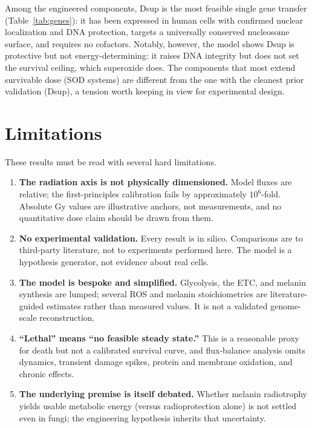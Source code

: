 \documentclass[11pt]{article}
\begin{document}
Among the engineered components, Dsup is the most feasible single gene transfer
(Table~\ref{tab:genes}): it has been expressed in human cells with confirmed
nuclear localization and DNA protection, targets a universally conserved nucleosome
surface, and requires no cofactors. Notably, however, the model shows Dsup is
protective but not energy-determining: it raises DNA integrity but does not set the
survival ceiling, which superoxide does. The components that most extend survivable
dose (SOD systems) are different from the one with the cleanest prior validation
(Dsup), a tension worth keeping in view for experimental design.

\section{Limitations}
\label{sec:limitations}

These results must be read with several hard limitations.
\begin{enumerate}
  \item \textbf{The radiation axis is not physically dimensioned.} Model fluxes are
  relative; the first-principles calibration fails by approximately $10^{6}$-fold.
  Absolute Gy values are illustrative anchors, not measurements, and no quantitative
  dose claim should be drawn from them.
  \item \textbf{No experimental validation.} Every result is in silico. Comparisons
  are to third-party literature, not to experiments performed here. The model is a
  hypothesis generator, not evidence about real cells.
  \item \textbf{The model is bespoke and simplified.} Glycolysis, the ETC, and
  melanin synthesis are lumped; several ROS and melanin stoichiometries are
  literature-guided estimates rather than measured values. It is not a validated
  genome-scale reconstruction.
  \item \textbf{``Lethal'' means ``no feasible steady state.''} This is a reasonable
  proxy for death but not a calibrated survival curve, and flux-balance analysis
  omits dynamics, transient damage spikes, protein and membrane oxidation, and
  chronic effects.
  \item \textbf{The underlying premise is itself debated.} Whether melanin
  radiotrophy yields usable metabolic energy (versus radioprotection alone) is not
  settled even in fungi; the engineering hypothesis inherits that uncertainty.
\end{enumerate}
\end{document}
